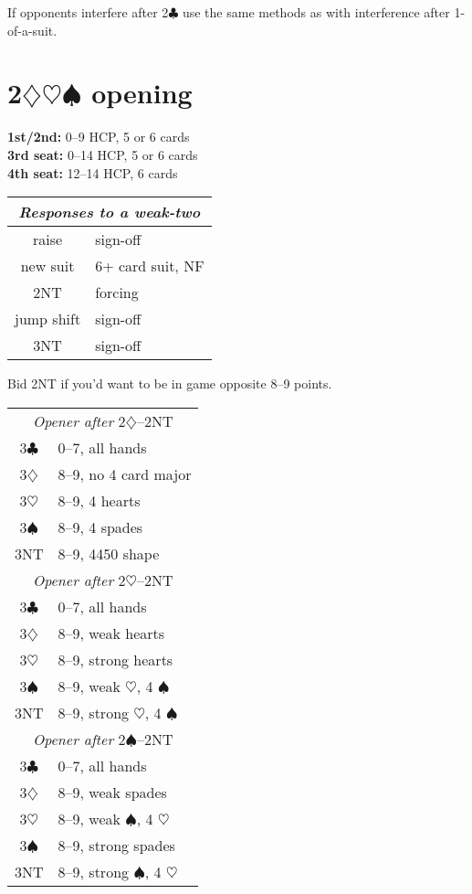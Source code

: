 \documentclass[a4paper, twoside, 11pt]{article}
\begin{document}
\begin{multicols}{3}
If opponents interfere after 2$\clubsuit$ use the same methods as with interference after 1-of-a-suit.

\section{2$\diamondsuit\heartsuit\spadesuit$ opening}

\textbf{1st/2nd:} 0--9 HCP, 5 or 6 cards \\ \textbf{3rd seat:} 0--14 HCP, 5 or 6 cards \\ \textbf{4th seat:} 12--14 HCP, 6 cards

\begin{center}
\begin{tabular}{ |c|l| }
 \hline
 \multicolumn{2}{|c|}{\textit{Responses to a weak-two}} \\
 \hline
 raise & sign-off\\
 new suit & 6+ card suit, NF  \\
2NT & forcing \\
 jump shift & sign-off \\
 3NT & sign-off \\
 \hline
\end{tabular}
\end{center}

Bid 2NT if you'd want to be in game opposite 8--9 points.
\begin{center}
\begin{tabular}{ |cl| }
 \hline
 \multicolumn{2}{|c|}{\textit{Opener after} 2$\diamondsuit$--2NT} \\
3$\clubsuit$ & 0--7, all hands\\
3$\diamondsuit$ & 8--9, no 4 card major \\
3$\heartsuit$ & 8--9, 4 hearts \\
3$\spadesuit$ & 8--9, 4 spades \\
 3NT & 8--9, 4450 shape \\
 \hline
 \multicolumn{2}{|c|}{\textit{Opener after} 2$\heartsuit$--2NT} \\
3$\clubsuit$ & 0--7, all hands\\
3$\diamondsuit$ & 8--9, weak hearts \\
3$\heartsuit$ & 8--9, strong hearts \\
3$\spadesuit$ & 8--9, weak $\heartsuit$, 4 $\spadesuit$ \\
 3NT & 8--9, strong $\heartsuit$, 4 $\spadesuit$ \\
 \hline
 \multicolumn{2}{|c|}{\textit{Opener after} 2$\spadesuit$--2NT} \\
3$\clubsuit$ & 0--7, all hands\\
3$\diamondsuit$ & 8--9, weak spades \\
3$\heartsuit$ & 8--9, weak $\spadesuit$, 4 $\heartsuit$ \\
3$\spadesuit$ & 8--9, strong spades \\
 3NT & 8--9, strong $\spadesuit$, 4 $\heartsuit$ \\
 \hline
\end{tabular}
\end{center}


\end{multicols}
\end{document}
